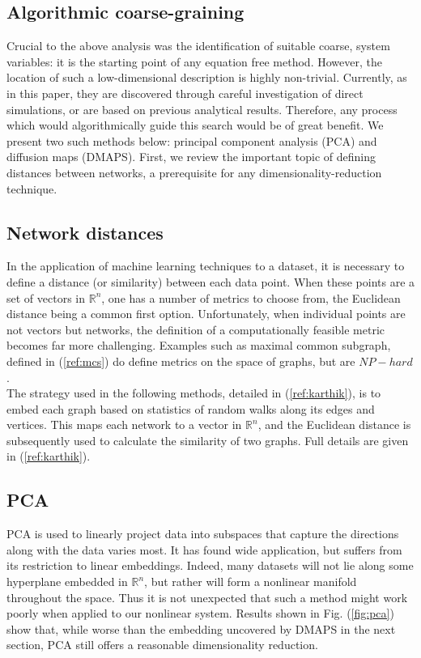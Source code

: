 \documentclass[12pt]{article}
\begin{document}
\begin{onehalfspace}
\section{Algorithmic coarse-graining}

Crucial to the above analysis was the identification of suitable coarse, system variables: it is the starting point of any equation free method. However, the location of such a low-dimensional description is highly non-trivial. Currently, as in this paper, they are discovered through careful investigation of direct simulations, or are based on previous analytical results. Therefore, any process which would algorithmically guide this search would be of great benefit. We present two such methods below: principal component analysis (PCA) and diffusion maps (DMAPS). First, we review the important topic of defining distances between networks, a prerequisite for any dimensionality-reduction technique.

\subsection{Network distances}

In the application of machine learning techniques to a dataset, it is necessary to define a distance (or similarity) between each data point. When these points are a set of vectors in $\mathbb{R}^n$, one has a number of metrics to choose from, the Euclidean distance being a common first option. Unfortunately, when individual points are not vectors but networks, the definition of a computationally feasible metric becomes far more challenging. Examples such as maximal common subgraph, defined in (\ref{ref:mcs}) do define metrics on the space of graphs, but are $NP-hard$. \\

The strategy used in the following methods, detailed in (\ref{ref:karthik}), is to embed each graph based on statistics of random walks along its edges and vertices. This maps each network to a vector in $\mathbb{R}^n$, and the Euclidean distance is subsequently used to calculate the similarity of two graphs. Full details are given in (\ref{ref:karthik}).

\subsection{PCA}

PCA is used to linearly project data into subspaces that capture the directions along with the data varies most. It has found wide application, but suffers from its restriction to linear embeddings. Indeed, many datasets will not lie along some hyperplane embedded in $\mathbb{R}^n$, but rather will form a nonlinear manifold throughout the space. Thus it is not unexpected that such a method might work poorly when applied to our nonlinear system. Results shown in Fig. (\ref{fig:pca}) show that, while worse than the embedding uncovered by DMAPS in the next section, PCA still offers a reasonable dimensionality reduction.


\end{onehalfspace}
\end{document}
